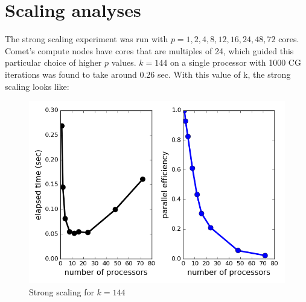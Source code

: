 \documentclass[12pt,letterpaper]{article}
\begin{document}
\section*{Scaling analyses}
\noindent The strong scaling experiment was run with $p = 1, 2, 4, 8, 12, 16, 24, 48, 72$ cores. Comet's compute nodes have cores that are multiples of 24, which guided this particular choice of higher $p$ values. $k = 144$ on a single processor with 1000 CG iterations was found to take around 0.26 sec. With this value of k, the strong scaling looks like:
%
\begin{figure}[h]
\centering
\includegraphics[scale = 0.7]{strongscale.png}
\caption{Strong scaling for $ k = 144$}
\end{figure}
\end{document}
